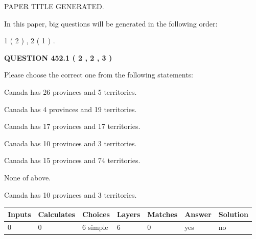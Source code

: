 \documentclass[12pt]{article}
\begin{document}
   
   
   
   
   
 \vspace{0.2in}
 
 
 
 
   
   
 PAPER TITLE GENERATED.
   
   
   
\vspace{0.2in}
   
In this paper, big questions will be generated in the following order: 
   
   
   1 ( 2 )
 ,
   2 ( 1 )
 .
  
\vspace{0.2in}
  
{\textbf{\Large{QUESTION
452.1 
 ( 2 , 2 , 3 )
}}}
  
  
Please choose the correct one from the following statements:
 
 
Canada has  26 provinces and  5 territories.
 
 
Canada has   4 provinces and  19 territories.
 
 
Canada has  17 provinces and  17 territories.
 
 
Canada has 10  provinces and 3 territories.
 
 
Canada has  15 provinces and  74 territories.
 
 
 None of above.
 
 
\noindent{}
 
 
Canada has 10  provinces and 3 territories.
 
 
\noindent{}
 
 
   
   
   
   
\noindent\begin{tabular}{|l|l|l|l|l|l|l|}
 \hline
Inputs & Calculates & Choices & Layers & Matches & Answer & Solution \\ \hline
 0  & 
 0  & 
 6
  simple  
  & 
 6  & 
 0  & 
  yes & 
  no 
  \\ \hline
 \end{tabular}
   
\end{document}
